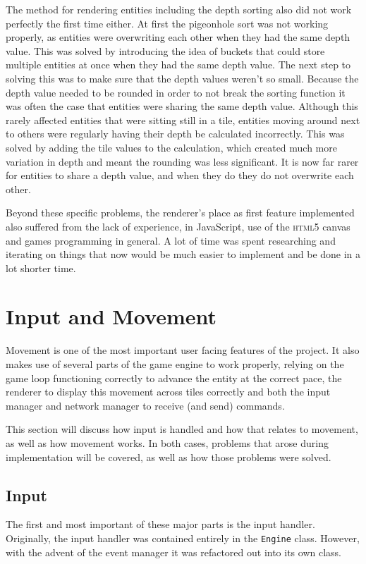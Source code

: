 The method for rendering entities including the depth sorting also did not work perfectly the first time either. At first the pigeonhole sort was not working properly, as entities were overwriting each other when they had the same depth value. This was solved by introducing the idea of buckets that could store multiple entities at once when they had the same depth value. The next step to solving this was to make sure that the depth values weren't so small. Because the depth value needed to be rounded in order to not break the sorting function it was often the case that entities were sharing the same depth value. Although this rarely affected entities that were sitting still in a tile, entities moving around next to others were regularly having their depth be calculated incorrectly. This was solved by adding the tile values to the calculation, which created much more variation in depth and meant the rounding was less significant. It is now far rarer for entities to share a depth value, and when they do they do not overwrite each other.

Beyond these specific problems, the renderer's place as first feature implemented also suffered from the lack of experience, in JavaScript, use of the \textsc{html5} canvas and games programming in general. A lot of time was spent researching and iterating on things that now would be much easier to implement and be done in a lot shorter time.

\section{Input and Movement}
Movement is one of the most important user facing features of the project. It also makes use of several parts of the game engine to work properly, relying on the game loop functioning correctly to advance the entity at the correct pace, the renderer to display this movement across tiles correctly and both the input manager and network manager to receive (and send) commands.

This section will discuss how input is handled and how that relates to movement, as well as how movement works. In both cases, problems that arose during implementation will be covered, as well as how those problems were solved.

\subsection{Input}\label{input_implementation}
The first and most important of these major parts is the input handler. Originally, the input handler was contained entirely in the \texttt{Engine} class. However, with the advent of the event manager it was refactored out into its own class.

